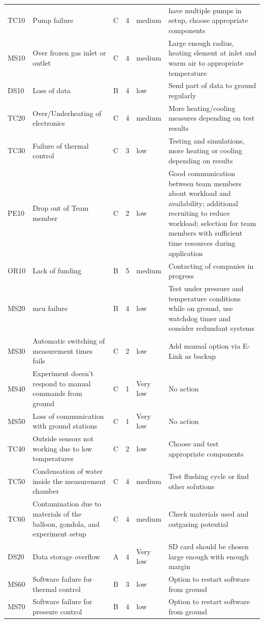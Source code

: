 \documentclass[12pt,a4paper]{report}
\begin{document}
\begin{longtable}{L{1.5cm}L{3cm}L{1cm}L{1cm}L{2cm}L{6cm}}
 TC10 & Pump failure & C & 4 & medium & have multiple pumps in setup, choose appropriate components \\
 MS10 & Over frozen gas inlet or outlet & C & 4 & medium & Large enough radius, heating element at inlet and warm air to appropriate temperature \\
 DS10 & Loss of data & B & 4 & low & Send part of data to ground regularly \\
 TC20 & Over/Underheating of electronics & C & 4 & medium & More heating/cooling measures depending on test results \\
 TC30 & Failure of thermal control & C & 3 & low & Testing and simulations, more heating or cooling depending on results \\
 PE10 & Drop out of Team member & C & 2 & low & Good communication between team members about workload and availability; additional recruiting to reduce workload; selection for team members with sufficient time resources during application \\
 OR10 & Lack of funding & B & 5 & medium & Contacting of companies in progress \\
 MS20 & \ac{mcu} failure & B & 4 & low & Test under pressure and temperature conditions while on ground, use watchdog timer and consider redundant systems\\
 MS30 & Automatic switching of measurement times fails & C & 2 & low & Add manual option via E-Link as backup \\
 MS40 & Experiment doesn't respond to manual commands from ground & C & 1 & Very low & No action \\
 MS50 & Loss of communication with ground stations & C & 1 & Very low & No action \\
 TC40 & Outside sensors not working due to low temperatures & C & 2 & low & Choose and test appropriate components \\
 TC50 & Condensation of water inside the measurement chamber & C & 4 & medium & Test flushing cycle or find other solutions \\
 TC60 & Contamination due to materials of the balloon, gondola, and experiment setup & C & 4 & medium & Check materials used and outgasing potential\\
 DS20 & Data storage overflow & A & 4 & Very low & SD card should be chosen large enough with enough margin \\
 MS60 & Software failure for thermal control & B & 3 & low & Option to restart software from ground \\
 MS70 & Software failure for pressure control & B & 4 & low & Option to restart software from ground \\
\end{longtable}
\end{document}
